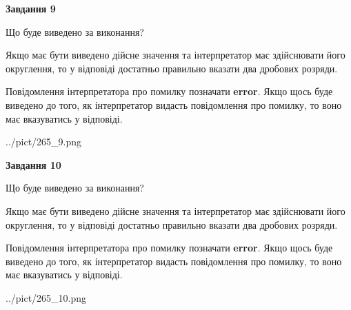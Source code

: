 \documentclass[12pt, ukrainian]{article}
\begin{document}
{\begin {Large}
{\begin {center}\textbf{Завдання 9}\end {center}}\par
Що буде виведено за виконання? \par

Якщо має бути виведено дійсне значення та інтерпретатор має здійснювати його округлення, 
то у відповіді достатньо правильно вказати два дробових розряди.

Повідомлення інтерпретатора про помилку позначати \textbf{error}.
Якщо щось буде виведено до того, як інтерпретатор видасть повідомлення про помилку, 
то воно має вказуватись у відповіді. \par

\begin{center}
	{../pict/265_9.png}
\end{center}
\newpage

{\begin {center}\textbf{Завдання 10}\end {center}}\par
Що буде виведено за виконання? \par

Якщо має бути виведено дійсне значення та інтерпретатор має здійснювати його округлення, 
то у відповіді достатньо правильно вказати два дробових розряди.

Повідомлення інтерпретатора про помилку позначати \textbf{error}.
Якщо щось буде виведено до того, як інтерпретатор видасть повідомлення про помилку, 
то воно має вказуватись у відповіді. \par

\begin{center}
	{../pict/265_10.png}
\end{center}
\newpage

\end {Large}}
\end{document}
